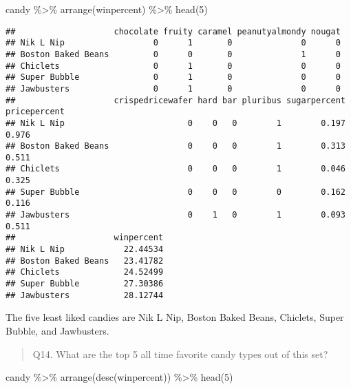 \documentclass[
]{article}
\newenvironment{Shaded}{\begin{snugshade}}{\end{snugshade}}
\newcommand{\DecValTok}[1]{\textcolor[rgb]{0.00,0.00,0.81}{#1}}
\newcommand{\FunctionTok}[1]{\textcolor[rgb]{0.00,0.00,0.00}{#1}}
\newcommand{\NormalTok}[1]{#1}
\newcommand{\SpecialCharTok}[1]{\textcolor[rgb]{0.00,0.00,0.00}{#1}}
\begin{document}
\begin{Shaded}
\begin{Highlighting}[]
\NormalTok{candy }\SpecialCharTok{\%\textgreater{}\%} \FunctionTok{arrange}\NormalTok{(winpercent) }\SpecialCharTok{\%\textgreater{}\%} \FunctionTok{head}\NormalTok{(}\DecValTok{5}\NormalTok{)}
\end{Highlighting}
\end{Shaded}

\begin{verbatim}
##                    chocolate fruity caramel peanutyalmondy nougat
## Nik L Nip                  0      1       0              0      0
## Boston Baked Beans         0      0       0              1      0
## Chiclets                   0      1       0              0      0
## Super Bubble               0      1       0              0      0
## Jawbusters                 0      1       0              0      0
##                    crispedricewafer hard bar pluribus sugarpercent pricepercent
## Nik L Nip                         0    0   0        1        0.197        0.976
## Boston Baked Beans                0    0   0        1        0.313        0.511
## Chiclets                          0    0   0        1        0.046        0.325
## Super Bubble                      0    0   0        0        0.162        0.116
## Jawbusters                        0    1   0        1        0.093        0.511
##                    winpercent
## Nik L Nip            22.44534
## Boston Baked Beans   23.41782
## Chiclets             24.52499
## Super Bubble         27.30386
## Jawbusters           28.12744
\end{verbatim}

The five least liked candies are Nik L Nip, Boston Baked Beans,
Chiclets, Super Bubble, and Jawbusters.

\begin{quote}
Q14. What are the top 5 all time favorite candy types out of this set?
\end{quote}

\begin{Shaded}
\begin{Highlighting}[]
\NormalTok{candy }\SpecialCharTok{\%\textgreater{}\%} \FunctionTok{arrange}\NormalTok{(}\FunctionTok{desc}\NormalTok{(winpercent)) }\SpecialCharTok{\%\textgreater{}\%} \FunctionTok{head}\NormalTok{(}\DecValTok{5}\NormalTok{)}
\end{Highlighting}
\end{Shaded}
\end{document}
